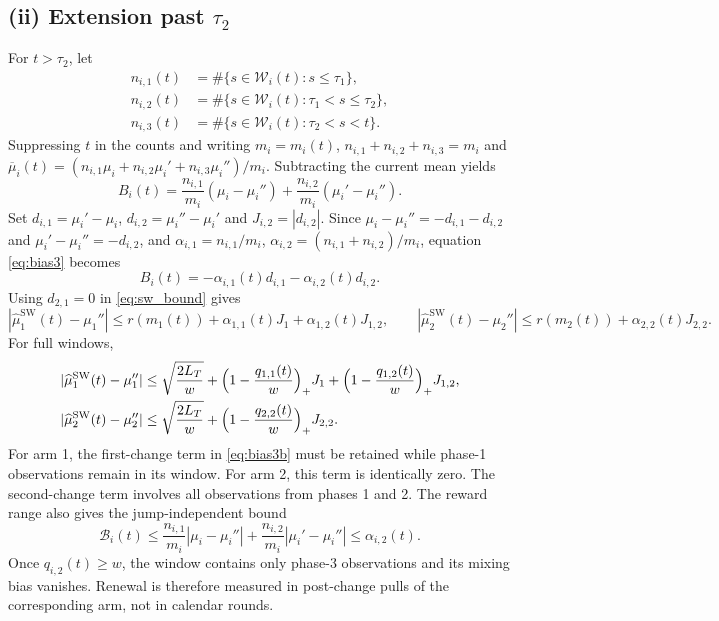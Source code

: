 \subsection*{(ii) Extension past $\tau_2$}

For $t>\tau_2$, let
\[
\begin{aligned}
n_{i,1}(t)&=\#\{s\in\mathcal W_i(t):s\le\tau_1\},\\
n_{i,2}(t)&=\#\{s\in\mathcal W_i(t):\tau_1<s\le\tau_2\},\\
n_{i,3}(t)&=\#\{s\in\mathcal W_i(t):\tau_2<s<t\}.
\end{aligned}
\]
Suppressing $t$ in the counts and writing $m_i=m_i(t)$, $n_{i,1}+n_{i,2}+n_{i,3}=m_i$ and $\overline\mu_i(t)=(n_{i,1}\mu_i+n_{i,2}\mu_i'+n_{i,3}\mu_i'')/m_i$. Subtracting the current mean yields
\begin{equation}\label{eq:bias3}
B_i(t)=\frac{n_{i,1}}{m_i}(\mu_i-\mu_i'')+\frac{n_{i,2}}{m_i}(\mu_i'-\mu_i'').
\end{equation}
Set $d_{i,1}=\mu_i'-\mu_i$, $d_{i,2}=\mu_i''-\mu_i'$ and $J_{i,2}=|d_{i,2}|$. Since $\mu_i-\mu_i''=-d_{i,1}-d_{i,2}$ and $\mu_i'-\mu_i''=-d_{i,2}$, and $\alpha_{i,1}=n_{i,1}/m_i$, $\alpha_{i,2}=(n_{i,1}+n_{i,2})/m_i$, equation \eqref{eq:bias3} becomes
\begin{equation}\label{eq:bias3b}
B_i(t)=-\alpha_{i,1}(t)d_{i,1}-\alpha_{i,2}(t)d_{i,2}.
\end{equation}
Using $d_{2,1}=0$ in \eqref{eq:sw_bound} gives
\begin{equation}\label{eq:phase3}
|\widehat\mu_1^{\mathrm{SW}}(t)-\mu_1''|\le r(m_1(t))+\alpha_{1,1}(t)J_1+\alpha_{1,2}(t)J_{1,2},\qquad
|\widehat\mu_2^{\mathrm{SW}}(t)-\mu_2''|\le r(m_2(t))+\alpha_{2,2}(t)J_{2,2}.
\end{equation}
For full windows,
\begin{equation}\label{eq:phase3_full}
\begin{aligned}
|\widehat\mu_1^{\mathrm{SW}}(t)-\mu_1''|&\le\sqrt{\frac{2L_T}{w}}+\Bigl(1-\frac{q_{1,1}(t)}{w}\Bigr)_+J_1+\Bigl(1-\frac{q_{1,2}(t)}{w}\Bigr)_+J_{1,2},\\
|\widehat\mu_2^{\mathrm{SW}}(t)-\mu_2''|&\le\sqrt{\frac{2L_T}{w}}+\Bigl(1-\frac{q_{2,2}(t)}{w}\Bigr)_+J_{2,2}.
\end{aligned}
\end{equation}
For arm 1, the first-change term in \eqref{eq:bias3b} must be retained while phase-1 observations remain in its window. For arm 2, this term is identically zero. The second-change term involves all observations from phases 1 and 2. The reward range also gives the jump-independent bound
\begin{equation}\label{eq:range_bias}
\mathcal B_i(t)\le\frac{n_{i,1}}{m_i}|\mu_i-\mu_i''|+\frac{n_{i,2}}{m_i}|\mu_i'-\mu_i''|\le\alpha_{i,2}(t).
\end{equation}
Once $q_{i,2}(t)\ge w$, the window contains only phase-3 observations and its mixing bias vanishes. Renewal is therefore measured in post-change pulls of the corresponding arm, not in calendar rounds.

